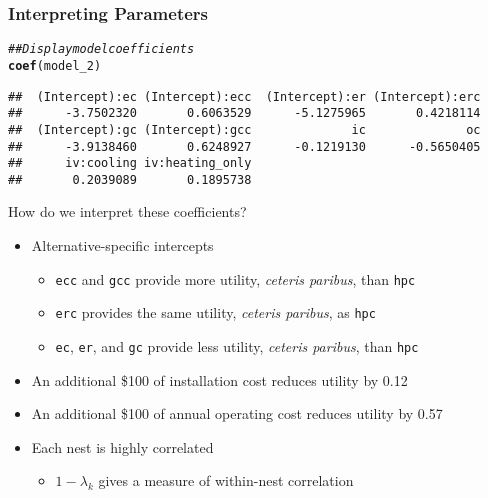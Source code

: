 \documentclass{beamer}\usepackage[]{graphicx}\usepackage[]{color}
\makeatletter
\newcommand{\hlcom}[1]{\textcolor[rgb]{0.678,0.584,0.686}{\textit{#1}}}%
\newcommand{\hlstd}[1]{\textcolor[rgb]{0.345,0.345,0.345}{#1}}%
\newcommand{\hlkwd}[1]{\textcolor[rgb]{0.737,0.353,0.396}{\textbf{#1}}}%
\newenvironment{kframe}{%
 \def\at@end@of@kframe{}%
 \ifinner\ifhmode%
  \def\at@end@of@kframe{\end{minipage}}%
  \begin{minipage}{\columnwidth}%
 \fi\fi%
 \def\FrameCommand##1{\hskip\@totalleftmargin \hskip-\fboxsep
 \colorbox{shadecolor}{##1}\hskip-\fboxsep
     \hskip-\linewidth \hskip-\@totalleftmargin \hskip\columnwidth}%
 \MakeFramed {\advance\hsize-\width
   \@totalleftmargin\z@ \linewidth\hsize
   \@setminipage}}%
 {\par\unskip\endMakeFramed%
 \at@end@of@kframe}
\newenvironment{knitrout}{}{} %
\makeatother
\begin{document}
\begin{frame}[fragile]\frametitle{Interpreting Parameters}
\begin{knitrout}\footnotesize
{}\color{fgcolor}\begin{kframe}
\begin{alltt}
\hlcom{## Display model coefficients}
\hlkwd{coef}\hlstd{(model_2)}
\end{alltt}
\begin{verbatim}
##  (Intercept):ec (Intercept):ecc  (Intercept):er (Intercept):erc 
##      -3.7502320       0.6063529      -5.1275965       0.4218114 
##  (Intercept):gc (Intercept):gcc              ic              oc 
##      -3.9138460       0.6248927      -0.1219130      -0.5650405 
##      iv:cooling iv:heating_only 
##       0.2039089       0.1895738
\end{verbatim}
\end{kframe}
\end{knitrout}
    \vspace{2ex}
    How do we interpret these coefficients?
    \begin{itemize}
    	\item Alternative-specific intercepts
    	\begin{itemize}
    		\item \texttt{ecc} and \texttt{gcc} provide more utility, \emph{ceteris paribus}, than \texttt{hpc}
	      \item \texttt{erc} provides the same utility, \emph{ceteris paribus}, as \texttt{hpc}
	      \item \texttt{ec}, \texttt{er}, and \texttt{gc} provide less utility, \emph{ceteris paribus}, than \texttt{hpc}
    	\end{itemize}
        \item An additional \$100 of installation cost reduces utility by 0.12
        \item An additional \$100 of annual operating cost reduces utility by 0.57
        \item Each nest is highly correlated
        \begin{itemize}
        	\item $1 - \lambda_k$ gives a measure of within-nest correlation
        \end{itemize}
    \end{itemize}
\end{frame}
\end{document}

